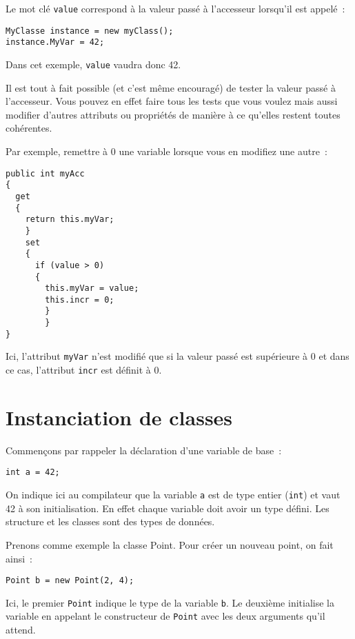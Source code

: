 Le mot clé \verb+value+ correspond à la valeur passé à l'accesseur lorsqu'il
est appelé~:

\begin{lstlisting}
MyClasse instance = new myClass();
instance.MyVar = 42;
\end{lstlisting}

Dans cet exemple, \verb+value+ vaudra donc 42.

Il est tout à fait possible (et c’est même encouragé) de tester la valeur passé
à l'accesseur. Vous pouvez en effet faire tous les tests que vous voulez mais
aussi modifier d'autres attributs ou propriétés de manière à ce qu'elles
restent toutes cohérentes.

Par exemple, remettre à 0 une variable lorsque vous en modifiez une autre~:
\begin{lstlisting}
public int myAcc
{
  get
  {
    return this.myVar;
    }
    set
    {
      if (value > 0)
      {
        this.myVar = value;
        this.incr = 0;
        }
        }
}
\end{lstlisting}

Ici, l'attribut \verb+myVar+ n'est modifié que si la valeur passé est
supérieure à 0 et dans ce cas, l'attribut \verb+incr+ est définit à 0.

\section{Instanciation de classes}

Commençons par rappeler la déclaration d'une variable de base~:

\begin{lstlisting}
int a = 42;
\end{lstlisting}

On indique ici au compilateur que la variable \verb+a+ est de type entier
(\verb+int+) et vaut 42 à son initialisation. En effet chaque variable doit
avoir un type défini. Les structure et les classes sont des types de données.

Prenons comme exemple la classe Point. Pour créer un nouveau point, on fait
ainsi~:

\begin{lstlisting}
Point b = new Point(2, 4);
\end{lstlisting}

Ici, le premier \verb+Point+ indique le type de la variable \verb+b+. Le deuxième initialise la variable en appelant le constructeur de \texttt{Point} avec les deux arguments qu'il attend.